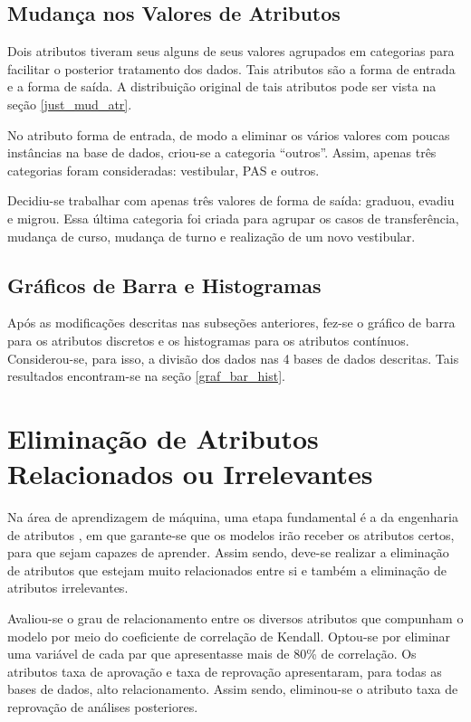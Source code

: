 \subsection{Mudança nos Valores de Atributos}
\par Dois atributos tiveram seus alguns de seus valores agrupados em categorias para
facilitar o posterior tratamento dos dados. Tais atributos são a forma de entrada e a
forma de saída. A distribuição original de tais atributos pode ser vista na seção 
\ref{just_mud_atr}. 
\par No atributo forma de entrada, de modo a eliminar os vários valores com poucas
instâncias na base de dados, criou-se a categoria ``outros''. Assim, apenas três 
categorias foram consideradas: vestibular, PAS e outros. 
\par Decidiu-se trabalhar com apenas três valores de forma de saída: graduou, evadiu
e migrou. Essa última categoria foi criada para agrupar os casos de transferência,
mudança de curso, mudança de turno e realização de um novo vestibular. 

\subsection{Gráficos de Barra e Histogramas}
Após as modificações descritas nas subseções anteriores, fez-se o gráfico de barra
para os atributos discretos e os histogramas para os atributos contínuos.
Considerou-se, para isso, a divisão dos dados nas 4 bases de dados descritas. Tais
resultados encontram-se na seção \ref{graf_bar_hist}.

\section{Eliminação de Atributos Relacionados ou Irrelevantes}
\par Na área de aprendizagem de máquina, uma etapa fundamental é a da engenharia de
atributos \cite{useful_ml}, em que garante-se que os modelos irão receber os
atributos certos, para que sejam capazes de aprender. Assim sendo, deve-se realizar a
eliminação de atributos que estejam muito relacionados entre si e também a eliminação
de atributos irrelevantes. 
 
\par Avaliou-se o grau de relacionamento entre os diversos atributos
que compunham o modelo por meio do coeficiente de correlação de Kendall. Optou-se por
eliminar uma variável de cada par que apresentasse mais de 80\% de correlação. Os
atributos taxa de aprovação e taxa de reprovação apresentaram, para todas as bases
de dados, alto relacionamento. Assim sendo, eliminou-se o atributo taxa de reprovação
de análises posteriores. 

